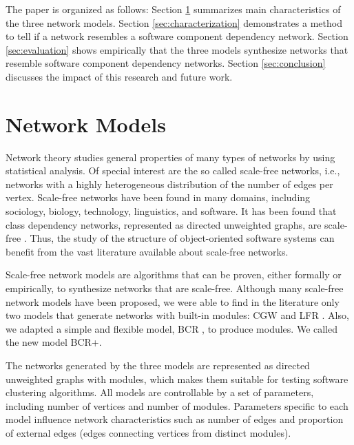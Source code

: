 The paper is organized as follows: Section \ref{sec:models} summarizes main
characteristics of the three network models.
%
Section \ref{sec:characterization} demonstrates a method to tell if a network
resembles a software component dependency network.
%
Section \ref{sec:evaluation} shows empirically that the three models synthesize
networks that resemble software component dependency networks.
%
Section \ref{sec:conclusion} discusses the impact of this research and future
work.


\section{Network Models} \label{sec:models} 

Network theory studies general properties of many types of networks by using
statistical analysis. Of special interest are the so called scale-free
networks, i.e., networks with a highly heterogeneous distribution of the number
of edges per vertex. Scale-free networks have been found in many domains,
including sociology, biology, technology, linguistics, and software. It has
been found that class dependency networks, represented as directed unweighted
graphs, are scale-free \cite{Myers2003}. Thus, the study of the structure of
object-oriented software systems can benefit from the vast literature available
about scale-free networks.

Scale-free network models are algorithms that can be proven, either formally or
empirically, to synthesize networks that are scale-free. Although many
scale-free network models have been proposed, we were able to find in the
literature only two models that generate networks with built-in modules: CGW
\cite{Chen2008} and LFR \cite{Lancichinetti2009}. Also, we adapted a simple and
flexible model, BCR \cite{Bollobas2003}, to produce modules. We called the new
model BCR+.

The networks generated by the three models are represented as directed
unweighted graphs with modules, which makes them suitable for testing software
clustering algorithms. All models are controllable by a set of parameters,
including number of vertices and number of modules. Parameters specific to each
model influence network characteristics such as number of edges and proportion
of external edges (edges connecting vertices from distinct modules).

